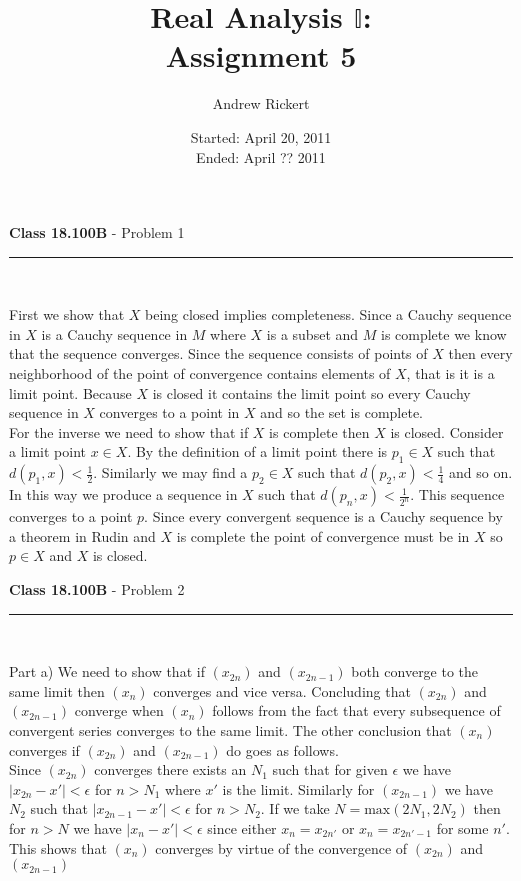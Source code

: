 \documentclass[11pt,reqno]{article}
\title{Real Analysis $\mathbb{I}$: \\ Assignment 5}
\author{Andrew Rickert}
\date{Started: April 20, 2011 \\ \hspace{1pt} Ended: April ??  2011}                                           %
\begin{document}
\maketitle


\begin{flushleft} 
\textbf{Class 18.100B} - Problem 1\\
\rule{500pt}{1pt}\\
\end{flushleft} 

First we show that $X$ being closed implies completeness. Since a Cauchy sequence in $X$ is a Cauchy sequence in $M$ where $X$ is a subset and $M$ is complete we know that the sequence converges. Since the sequence consists of points of $X$ then every neighborhood of the point of convergence contains elements of $X$, that is it is a limit point. Because $X$ is closed it contains the limit point so every Cauchy sequence in $X$ converges to a point in $X$ and so the set is complete.\\
\indent For the inverse we need to show that if $X$ is complete then $X$ is closed. Consider a limit point $x \in X$. By the definition of a limit point there is $p_1 \in X$ such that $d(p_1,x) < \frac{1}{2}$. Similarly we may find a $p_2 \in X$ such that $d(p_2,x) < \frac{1}{4}$ and so on. In this way we produce a sequence in $X$ such that $d(p_n,x) < \frac{1}{2^n}$. This sequence converges to a point $p$. Since every convergent sequence is a Cauchy sequence by a theorem in Rudin and $X$ is complete the point of convergence must be in $X$ so $p \in X$ and $X$ is closed.

\vspace{15pt}
\begin{flushleft} 
\textbf{Class 18.100B} - Problem 2\\
\rule{500pt}{1pt}\\
\end{flushleft} 

Part a) We need to show that if $(x_{2n})$ and $(x_{2n-1})$ both converge to the same limit then $(x_n)$ converges and vice versa. Concluding that $(x_{2n})$ and $(x_{2n-1})$ converge when $(x_n)$ follows from the fact that every subsequence of convergent series converges to the same limit. The other conclusion that $(x_n)$ converges if $(x_{2n})$ and $(x_{2n-1})$ do goes as follows.\\
\indent Since $(x_{2n})$ converges there exists an $N_1$ such that for given $\epsilon$ we have $|x_{2n}-x'| < \epsilon$ for $n > N_1$ where $x'$ is the limit. Similarly for $(x_{2n-1})$ we have $N_2$ such that  $|x_{2n-1}-x'| < \epsilon$ for $n > N_2$. If we take $N = \text{max} (2N_1,2N_2)$ then for $n > N$ we have $|x_n -x'| < \epsilon$ since either $x_n = x_{2n'}$ or $x_n = x_{2n'-1}$ for some $n'$. This shows that $(x_n)$ converges by virtue of the convergence of $(x_{2n})$ and $(x_{2n-1})$ 
\end{document}
